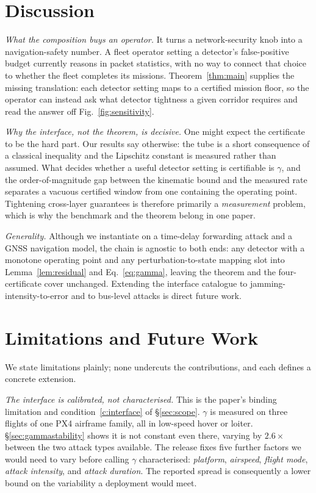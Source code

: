 \section{Discussion}
\label{sec:discussion}
\emph{What the composition buys an operator.} It turns a network-security knob
into a navigation-safety number. A fleet operator setting a detector's
false-positive budget currently reasons in packet statistics, with no way to
connect that choice to whether the fleet completes its missions.
Theorem~\ref{thm:main} supplies the
missing translation: each detector setting maps to a certified mission floor, so
the operator can instead ask what detector tightness a given corridor requires
and read the answer off Fig.~\ref{fig:sensitivity}.

\emph{Why the interface, not the theorem, is decisive.} One might expect the
certificate to be the hard part. Our results say otherwise: the tube is a short
consequence of a classical inequality and the Lipschitz constant is measured
rather than assumed. What decides whether a useful detector setting is
certifiable is $\gamma$, and the order-of-magnitude gap between the kinematic
bound and the measured rate separates a vacuous certified window from one
containing the operating point. Tightening cross-layer guarantees is therefore
primarily a \emph{measurement} problem, which is why the benchmark and the
theorem belong in one paper.

\emph{Generality.} Although we instantiate on a time-delay forwarding attack and
a GNSS navigation model, the chain is agnostic to both ends: any detector with a
monotone operating point and any perturbation-to-state mapping slot into
Lemma~\ref{lem:residual} and Eq.~\eqref{eq:gamma}, leaving the theorem and the
four-certificate cover unchanged. Extending the interface catalogue to
jamming-intensity-to-error and to bus-level attacks is direct future work.

\section{Limitations and Future Work}
\label{sec:limitations}
We state limitations plainly; none undercuts the contributions, and each defines
a concrete extension.

\emph{The interface is calibrated, not characterised.} This is the paper's
binding limitation and condition~\ref{c:interface} of \S\ref{sec:scope}.
$\gamma$ is measured on three flights of one PX4 airframe family, all in
low-speed hover or loiter. \S\ref{sec:gammastability} shows it is not constant
even there, varying by $2.6\times$ between the two attack types available. The
release fixes five further factors we would need to vary before calling $\gamma$
characterised: \emph{platform}, \emph{airspeed}, \emph{flight mode},
\emph{attack intensity}, and \emph{attack duration}. The reported spread is
consequently a lower bound on the variability a deployment would meet.

